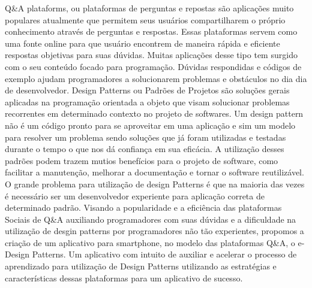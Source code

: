 Q\&A plataforms, ou plataformas de perguntas e repostas são aplicações muito populares atualmente que permitem seus usuários compartilharem o próprio conhecimento através de perguntas e respostas. Essas plataformas servem como uma fonte online para que usuário encontrem de maneira rápida e eficiente respostas objetivas para suas dúvidas. Muitas aplicações desse tipo tem surgido com o seu conteúdo focado para programação. Dúvidas respondidas e códigos de exemplo ajudam programadores a solucionarem problemas e obstáculos no dia dia de desenvolvedor.
Design Patterns ou Padrões de Projetos são soluções gerais aplicadas na programação orientada a objeto que visam solucionar problemas recorrentes em determinado contexto no projeto de softwares. Um design pattern não é um código pronto para se aproveitar em uma aplicação e sim um modelo para resolver um problema sendo soluções que já foram utilizadas e testadas durante o tempo o que nos dá confiança em sua eficácia. A utilização desses padrões podem trazem mutios benefícios para o projeto de software, como facilitar a manutenção, melhorar a documentação e tornar o software reutilizável. O grande problema para utilização de design Patterns é que na maioria das vezes é necessário ser um desenvolvedor experiente para aplicação correta de determinado padrão.
Visando a popularidade e a eficiência das plataformas Sociais de Q\&A auxiliando programadores com suas dúvidas  e a dificuldade na utilização de desgin patterns por programadores não tão experientes, propomos a criação de um aplicativo para smartphone, no modelo das plataformas Q\&A, o e-Design Patterns. Um aplicativo com intuito de auxiliar e acelerar o processo de aprendizado para utilização de Design Patterns utilizando as estratégias e características dessas plataformas para um aplicativo de sucesso.
